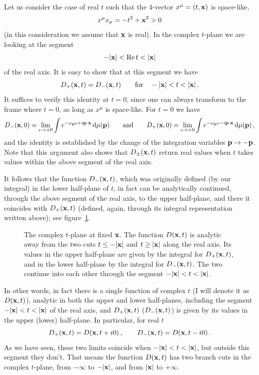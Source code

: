 Let us consider the case of real $t$ such that the 4-vector $x^\mu=(t,\mathbf{x})$ is
space-like,
\[
x^\mu x_\mu=-t^2+\mathbf{x}^2>0
\]
(in this consideration we assume that $\mathbf{x}$ is real). In the complex $t$-plane
we are looking at the segment
\[
-|\xx|<\Re t<|\xx|
\]
of the real axis. It is easy to show that at this segment we have
\[
D_+(\xx,t)=D_-(\xx,t)\qquad\text{for}\quad -|\xx|<t<|\xx|\,.
\]
It suffices to verify this identity at $t=0$, since one can always transform
to the frame where $t=0$, as long as $x^\mu$ is space-like. For $t=0$ we have
\[
D_-(\mathbf{x},0)=\lim_{\epsilon\to+0}\int e^{-\omega_{\mathbf{p}}\epsilon+i\mathbf{p}\cdot\mathbf{x}}\mathop{}\!\mathrm{d}\mu(\mathbf{p})
\qquad\text{and}\qquad
D_+(\mathbf{x},0)=\lim_{\epsilon\to+0}\int e^{-\omega_{\mathbf{p}}\epsilon-i\mathbf{p}\cdot\mathbf{x}}\mathop{}\!\mathrm{d}\mu(\mathbf{p})\,,
\]
and the identity is established by the change of the integration variables
$\mathbf{p}\to-\mathbf{p}$. Note that this argument also shows that $D_\pm(\mathbf{x},t)$ return
real values when $t$ takes values within the above segment of the real axis.

It follows that the function $D_-(\mathbf{x},t)$, which was originally defined (by
our integral) in the lower half-plane of $t$, in fact can be analytically
continued, through the above segment of the real axis, to the upper
half-plane, and there it coincides with $D_+(\mathbf{x},t)$ (defined, again, through
its integral representation written above); see figure~\ref{fig:tplane}.
\begin{figure}[ht]
\centering{}
\caption{The complex $t$-plane at fixed $\mathbf{x}$. The function $D(\mathbf{x},t)$ is
analytic away from the two cuts $t\le-|\mathbf{x}|$ and $t\ge|\mathbf{x}|$ along the real
axis. Its values in the upper half-plane are given by the integral for
$D_+(\mathbf{x},t)$, and in the lower half-plane by the integral for $D_-(\mathbf{x},t)$.
The two continue into each other through the segment $-|\xx|<t<|\xx|$.}
\label{fig:tplane}
\end{figure}

In other words, in fact there is a single function of complex $t$ (I will
denote it as $D(\mathbf{x},t)$), analytic in both the upper and lower half-planes,
including the segment $-|\xx|<t<|\xx|$ of the real axis, and $D_+(\mathbf{x},t)$
($D_-(\mathbf{x},t)$) is given by its values in the upper (lower) half-plane. In
particular, for real $t$
\[
D_+(\mathbf{x},t)=D(\mathbf{x},t+i0)\,,\qquad D_-(\mathbf{x},t)=D(\mathbf{x},t-i0)\,.
\]
As we have seen, these two limits coincide when $-|\xx|<t<|\xx|$, but outside
this segment they don't. That means the function $D(\mathbf{x},t)$ has two branch
cuts in the complex $t$-plane, from $-\infty$ to $-|\mathbf{x}|$, and from $|\mathbf{x}|$ to
$+\infty$.


